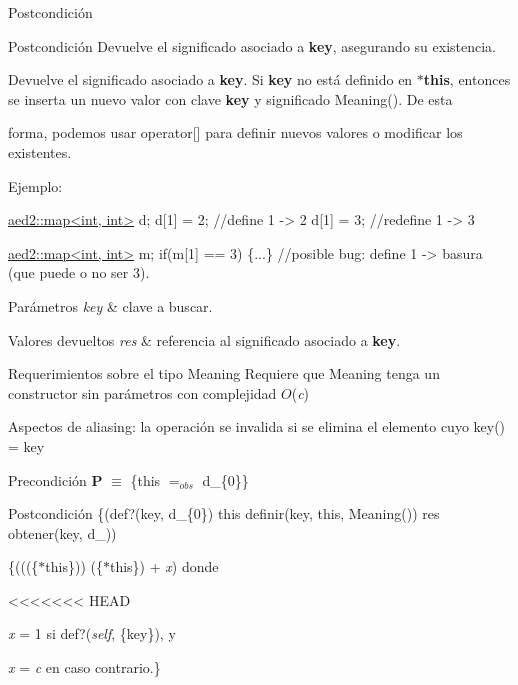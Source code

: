 \begin{DoxyPostcond}{\-Postcondición}
\begin{DoxyPostcond}{\-Postcondición}
Devuelve el significado asociado a {\bfseries key}, asegurando su existencia. 

Devuelve el significado asociado a {\bfseries key}. Si {\bfseries key} no está definido en {\bfseries $\ast$this}, entonces se inserta un nuevo valor con clave {\bfseries key} y significado Meaning(). De esta

forma, podemos usar {\ttfamily operator\mbox{[}\mbox{]}} para definir nuevos valores o modificar los existentes.

Ejemplo\+: 
\begin{DoxyCode}
\hyperlink{classaed2_1_1map}{aed2::map<int, int>} d;
d[1] = 2;      \textcolor{comment}{//define 1 -> 2}
d[1] = 3;      \textcolor{comment}{//redefine 1 -> 3}

\hyperlink{classaed2_1_1map}{aed2::map<int, int>} m;
\textcolor{keywordflow}{if}(m[1] == 3) \{...\} \textcolor{comment}{//posible bug: define 1 -> basura (que puede o no ser 3).}
\end{DoxyCode}



\begin{DoxyParams}{Parámetros}
{\em key} & clave a buscar. \\
\hline
\end{DoxyParams}

\begin{DoxyRetVals}{Valores devueltos}
{\em res} & referencia al significado asociado a {\bfseries key}.\\
\hline
\end{DoxyRetVals}
\begin{DoxyParagraph}{Requerimientos sobre el tipo Meaning}
Requiere que Meaning tenga un constructor sin parámetros con complejidad $O$({\itshape c})
\end{DoxyParagraph}
\begin{DoxyParagraph}{Aspectos de aliasing\+:}
la operación se invalida si se elimina el elemento cuyo key() = key
\end{DoxyParagraph}
\begin{DoxyPrecond}{Precondición}
{\bfseries P} $\equiv$ \{this $=_{obs}$ d\+\_\+\{0\}\} 
\end{DoxyPrecond}
\begin{DoxyPostcond}{Postcondición}
\{(def?(key, d\+\_\+\{0\})  this  definir(key, this, Meaning())  res  obtener(key, d\+\_))
\end{DoxyPostcond}
\{(((\{$\ast$this\}))  (\{$\ast$this\}) + {\itshape x}) donde
\begin{DoxyItemize}
<<<<<<< HEAD
\item {\itshape x\/} = 1 si def?({\itshape self\/}, \{key\}), y
\item {\itshape x\/} = {\itshape c\/} en caso contrario.\}
\end{DoxyItemize}


\end{DoxyPostcond}
\end{DoxyPostcond}
